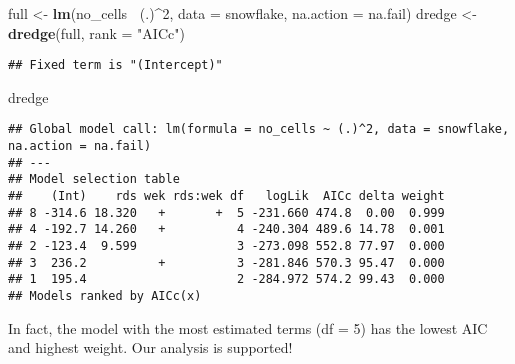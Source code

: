 \documentclass[]{article}
\newenvironment{Shaded}{\begin{snugshade}}{\end{snugshade}}
\newcommand{\KeywordTok}[1]{\textcolor[rgb]{0.13,0.29,0.53}{\textbf{#1}}}
\newcommand{\DataTypeTok}[1]{\textcolor[rgb]{0.13,0.29,0.53}{#1}}
\newcommand{\DecValTok}[1]{\textcolor[rgb]{0.00,0.00,0.81}{#1}}
\newcommand{\StringTok}[1]{\textcolor[rgb]{0.31,0.60,0.02}{#1}}
\newcommand{\OperatorTok}[1]{\textcolor[rgb]{0.81,0.36,0.00}{\textbf{#1}}}
\newcommand{\NormalTok}[1]{#1}
\begin{document}
\begin{Shaded}
\begin{Highlighting}[]
\NormalTok{full <-}\StringTok{ }\KeywordTok{lm}\NormalTok{(no_cells }\OperatorTok{~}\NormalTok{(.)}\OperatorTok{^}\DecValTok{2}\NormalTok{, }\DataTypeTok{data =}\NormalTok{ snowflake, }\DataTypeTok{na.action =}\NormalTok{ na.fail)}
\NormalTok{dredge <-}\StringTok{ }\KeywordTok{dredge}\NormalTok{(full, }\DataTypeTok{rank =} \StringTok{"AICc"}\NormalTok{)}
\end{Highlighting}
\end{Shaded}

\begin{verbatim}
## Fixed term is "(Intercept)"
\end{verbatim}

\begin{Shaded}
\begin{Highlighting}[]
\NormalTok{dredge}
\end{Highlighting}
\end{Shaded}

\begin{verbatim}
## Global model call: lm(formula = no_cells ~ (.)^2, data = snowflake, na.action = na.fail)
## ---
## Model selection table 
##    (Int)    rds wek rds:wek df   logLik  AICc delta weight
## 8 -314.6 18.320   +       +  5 -231.660 474.8  0.00  0.999
## 4 -192.7 14.260   +          4 -240.304 489.6 14.78  0.001
## 2 -123.4  9.599              3 -273.098 552.8 77.97  0.000
## 3  236.2          +          3 -281.846 570.3 95.47  0.000
## 1  195.4                     2 -284.972 574.2 99.43  0.000
## Models ranked by AICc(x)
\end{verbatim}

In fact, the model with the most estimated terms (df = 5) has the lowest
AIC and highest weight. Our analysis is supported!
\end{document}

